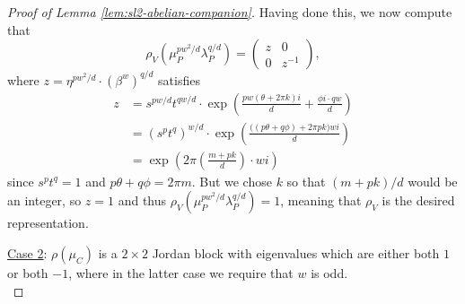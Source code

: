 \documentclass[10pt,a4paper]{amsart}
\begin{document}
\begin{proof}[Proof of Lemma \ref{lem:sl2-abelian-companion}]
Having done this, we now compute that
\[ \rho_V(\mu_P^{pw^2/d} \lambda_P^{q/d}) = \begin{pmatrix} z & 0 \\ 0 & z^{-1} \end{pmatrix}, \]
where $z = \eta^{pw^2/d} \cdot (\beta^w)^{q/d}$ satisfies
\begin{align*}
z &= s^{pw/d} t^{qw/d} \cdot \exp\left( \frac{pw(\theta+2\pi k)i}{d} + \frac{\phi i \cdot qw}{d}\right) \\
&= (s^pt^q)^{w/d} \cdot \exp\left( \frac{\big((p\theta+q\phi) + 2\pi pk\big)wi }{d} \right) \\
&= \exp\left( 2\pi \left(\frac{m+pk}{d}\right) \cdot wi \right)
\end{align*}
since $s^pt^q = 1$ and $p\theta + q\phi = 2\pi m$.  But we chose $k$ so that $(m+pk)/d$ would be an integer, so $z=1$ and thus $\rho_V(\mu_P^{pw^2/d}\lambda_P^{q/d}) = 1$, meaning that $\rho_V$ is the desired representation.

\vspace{1em}\noindent
\underline{Case 2}: $\rho(\mu_C)$ is a $2\times 2$ Jordan block with  eigenvalues which are either both $1$ or both $-1$, where  in the latter case we require that $w$ is odd.\\


\end{proof}
\end{document}
